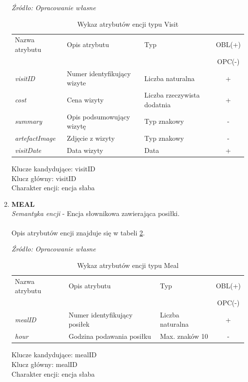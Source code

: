 \documentclass[12pt,twoside]{report}
\begin{document}
\begin{enumerate}[start=10,label={\bfseries ENC$\backslash$\arabic*}]
\begin{table}[H]
	\caption{Wykaz atrybutów encji typu Visit }
	\textit{Źródło: Opracowanie własne}
	\label{VisitAtribute}
	\centering
	\begin{tabular}{|l|l|l|c|}
		\hline
		Nazwa atrybutu & Opis atrybutu & Typ & OBL(+) \\
		& & &  OPC(-) \\
		\hline
		\textit{visitID} & Numer identyfikujący wizyte & Liczba naturalna & + \\
		\hline
		\textit{cost} & Cena wizyty & Liczba rzeczywista dodatnia & + \\
		\hline
		\textit{summary} & Opis podsumowujący wizytę & Typ znakowy & - \\
		\hline
		\textit{artefactImage} & Zdjęcie z wizyty & Typ znakowy & - \\
		\hline
		\textit{visitDate} & Data wizyty & Data & + \\
		\hline
	\end{tabular}
\end{table}
Klucze kandydujące: visitID \\
Klucz główny: visitID \\
Charakter encji: encja słaba \\

\item \textbf{MEAL} \\
\textit{Semantyka encji} - Encja słownikowa zawierająca posiłki.
\\ \\
Opis atrybutów encji znajduje się w tabeli \ref{MealAtribute}.

\begin{table}[H]
	\caption{Wykaz atrybutów encji typu Meal}
	\textit{Źródło: Opracowanie własne}
	\label{MealAtribute}
	\centering
	\begin{tabular}{|l|l|l|c|}
		\hline
		Nazwa atrybutu & Opis atrybutu & Typ & OBL(+) \\
		& & &  OPC(-) \\
		\hline
		\textit{mealID} & Numer identyfikujący posiłek & Liczba naturalna & + \\
		\hline
		\textit{hour} & Godzina podawania posiłku & Max. znaków 10 & - \\
		\hline
	\end{tabular}
\end{table}
Klucze kandydujące: mealID \\
Klucz główny: mealID \\
Charakter encji: encja słaba \\
\end{enumerate}
\end{document}
